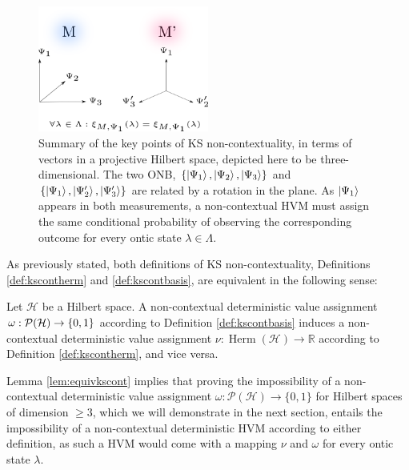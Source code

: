 \begin{figure}
    \centering
    \includegraphics[width=0.5\textwidth]{images/onb.png}
    \caption{Summary of the key points of KS non-contextuality, in terms of vectors in a projective Hilbert space, depicted here to be three-dimensional. The two ONB, $\{\ket{\Psi_1}, \ket{\Psi_2}, \ket{\Psi_3}\}$ and $\{\ket{\Psi_1}, \ket{\Psi_2'}, \ket{\Psi_3'}\}$ are related by a rotation in the plane. As $\ket{\Psi_1}$ appears in both measurements, a non-contextual HVM must assign the same conditional probability of observing the corresponding outcome for every ontic state $\lambda\in\Lambda$.}
    \label{fig:onb}
\end{figure}

As previously stated, both definitions of KS non-contextuality, Definitions \ref{def:kscontherm} and \ref{def:kscontbasis}, are equivalent in the following sense:

\begin{lemma}
\label{lem:equivkscont}
Let $\mathcal{H}$ be a Hilbert space. A non-contextual deterministic value assignment $\hfill\break\omega:\mathcal{P}(\mathcal{H})\rightarrow\{0,1\}$ according to Definition \ref{def:kscontbasis} induces a non-contextual deterministic value assignment $\nu:\operatorname{Herm}(\mathcal{H})\rightarrow\mathbb{\mathbb{R}}$ according to Definition \ref{def:kscontherm}, and vice versa.
\end{lemma}

Lemma \ref{lem:equivkscont} implies that proving the impossibility of a non-contextual deterministic value assignment $\omega:\mathcal{P}(\mathcal{H})\rightarrow\{0,1\}$ for Hilbert spaces of dimension $\geq3$, which we will demonstrate in the next section, entails the impossibility of a non-contextual deterministic HVM according to either definition, as such a HVM would come with a mapping $\nu$ and $\omega$ for every ontic state $\lambda$.

